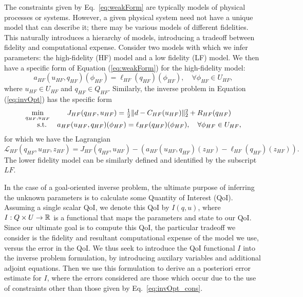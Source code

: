 The constraints given by Eq.~\eqref{eq:weakForm} are typically models of physical processes or systems. However, a given physical system need not have a unique model that can describe it; there may be various models of different fidelities. This naturally introduces a hierarchy of models, introducing a tradeoff between fidelity and computational expense. Consider two models with which we infer parameters: the high-fidelity (HF) model and a low fidelity (LF) model. We then have a specific form of Equation (\ref{eq:weakForm}) for the high-fidelity model:
\begin{equation}
a_{HF}(u_{HF},q_{HF})(\phi_{HF})=\ell_{HF}(q_{HF})(\phi_{HF}),\quad\forall\phi_{HF}\in U_{HF},
\end{equation}
where $u_{HF}\in U_{HF}$ and $q_{HF}\in Q_{HF}$. Similarly, the inverse problem in Equation (\ref{eq:invOpt}) has the specific form
\begin{equation}
\begin{array}{r@{}c}
\min\limits_{q_{HF},u_{HF}} & \quad J_{HF}(q_{HF},u_{HF})=\frac{1}{2}\|d-C_{HF}(u_{HF})\|_2^2 + R_{HF}(q_{HF}) \\ \textrm{s.t. }& \quad a_{HF}(u_{HF},q_{HF})(\phi_{HF})=\ell_{HF}(q_{HF})(\phi_{HF}),\quad\forall\phi_{HF}\in U_{HF},
\end{array}
\end{equation}
for which we have the Lagrangian
\begin{equation}
\mathcal{L}_{HF}(q_{HF},u_{HF},z_{HF})= J_{HF}(q_{HF},u_{HF})-(a_{HF}(u_{HF},q_{HF})(z_{HF})-\ell_{HF}(q_{HF})(z_{HF})).
\end{equation}
The lower fidelity model can be similarly defined and identified by the subscript $LF$.

In the case of a goal-oriented inverse problem, the ultimate purpose of inferring the unknown parameters is to calculate some Quantity of Interest (QoI). Assuming a single scalar QoI, we denote this QoI by $I(q,u)$, where $I:Q\times U\to{\mathbb{R}}$ is a functional that maps the parameters and state to our QoI. Since our ultimate goal is to compute this QoI, the particular tradeoff we consider is the fidelity and resultant computational expense of the model we use, versus the error in the QoI. We thus seek to introduce the QoI functional $I$ into the inverse problem formulation, by introducing auxilary variables and additional adjoint equations. Then we use this formulation to derive an a posteriori error estimate for $I$, where the errors considered are those which occur due to the use of constraints other than those given by Eq.~\eqref{eq:invOpt_cons}.
%
